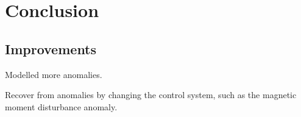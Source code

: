 \chapter{Conclusion}
\label{chap:Conclusion}

\section{Improvements}
Modelled more anomalies.

Recover from anomalies by changing the control system, such as the magnetic moment disturbance anomaly.